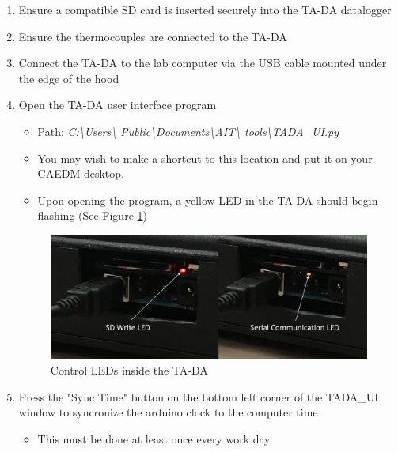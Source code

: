 \documentclass[letterpaper,11pt]{article}
\begin{document}
\begin{enumerate}
\begin{itemize}
        \end{itemize}
    
    \item Ensure a compatible SD card is inserted securely into the TA-DA 
        datalogger
    \item Ensure the thermocouples are connected to the TA-DA

    \item Connect the TA-DA to the lab computer via the USB cable mounted 
        under the edge of the hood
    
    \item Open the TA-DA user interface program 
            \begin{itemize}
            \item Path: \textit{C:\textbackslash Users\textbackslash  
                Public\textbackslash Documents\textbackslash AIT\textbackslash 
                tools\textbackslash TADA\_UI.py}
            \item You may wish to make a shortcut to this location and put it on 
                your CAEDM desktop.
            \item Upon opening the program, a yellow LED in the TA-DA should 
                begin flashing (See Figure \ref{fig:tada_leds})
            \end{itemize}

\begin{figure}[H]
\centering
\includegraphics[width=.75\textwidth]{led_red_yellow.jpg}
\caption{Control LEDs inside the TA-DA}
\label{fig:tada_leds}
\end{figure}
    
    \item Press the "Sync Time" button on the bottom left corner of the TADA\_UI
        window to syncronize the arduino clock to the computer time
        \begin{itemize}
        \item This must be done at least once every work day
        \end{itemize}
        

\end{enumerate}
\end{document}
